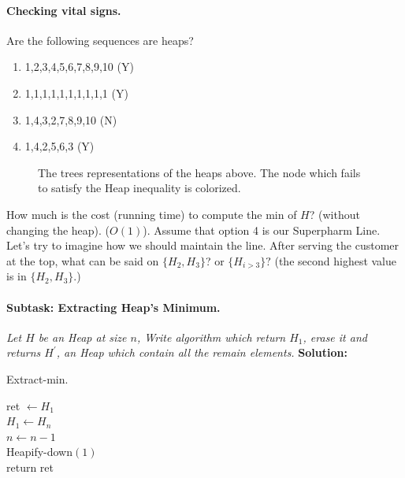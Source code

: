 \paragraph{Checking vital signs.}Are the following sequences are heaps? 
\begin{enumerate}
  \item 1,2,3,4,5,6,7,8,9,10 (Y)
  \item 1,1,1,1,1,1,1,1,1,1  (Y)
  \item 1,4,3,2,7,8,9,10     (N)
  \item 1,4,2,5,6,3	     (Y)
\end{enumerate}
\begin{figure}[h]
  \centering
  \begin{subfigure}[b]{0.3\textwidth}
	
  \end{subfigure}
\begin{subfigure}[b]{0.3\textwidth}
	
  \end{subfigure}
\begin{subfigure}[b]{0.3\textwidth}
	
  \end{subfigure}
  \caption{The trees representations of the heaps above. The node which fails to satisfy the Heap inequality is colorized.}
\end{figure}
How much is the cost (running time) to compute the min of $H$? (without changing the heap). ($O\left( 1 \right)$). Assume that option 4 is our Superpharm Line. Let's try to imagine how we should maintain the line. After serving the customer at the top, what can be said on $ \{ H_{2}, H_{3}\}$? or $\{H_{i>3}\}?$ (the second highest value is in $\{H_{2}, H_{3} \}$.)   
\paragraph{Subtask: Extracting Heap's Minimum.} \textit{Let $H$ be an Heap at size $n$, Write algorithm which return $H_1$, erase it and returns $H^\prime$, an Heap which contain all the remain elements.} 
\textbf{Solution:} 

\begin{algbox}{Extract-min.}
\begin{algorithm}[H]
ret $\leftarrow H_{1} $ \\
$ H_{1} \leftarrow H_{n} $  \\
$ n \leftarrow n -1 $ \\
Heapify-down$\left( 1 \right)$ \\
return ret  
\end{algorithm}
\end{algbox}



